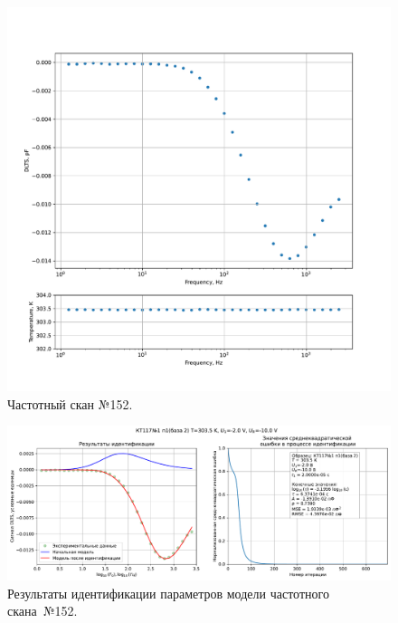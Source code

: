 \begin{figure}[!ht]
    \centering
    \includegraphics[width=1\textwidth]{../plots/КТ117№1_п1(база 2)_2500Гц-1Гц_1пФ_+30С_-2В-10В_200мВ_20мкс_шаг_0,1.pdf}
    \caption{Частотный скан №152.}
    \label{pic:frequency_scan_152}
\end{figure}

\begin{figure}[!ht]
    \centering
    \includegraphics[width=1\textwidth]{../plots/КТ117№1_п1(база 2)_2500Гц-1Гц_1пФ_+30С_-2В-10В_200мВ_20мкс_шаг_0,1_model.pdf}
    \caption{Результаты идентификации параметров модели частотного скана~№152.}
    \label{pic:frequency_scan_model152}
\end{figure}

\pagebreak


